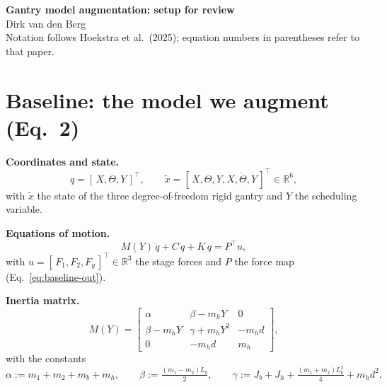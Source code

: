 \documentclass[11pt]{article}
\newcommand{\R}{\mathbb{R}}
\newcommand{\xb}{\tilde{x}}
\begin{document}
\begin{center}
  {\LARGE\bfseries Gantry model augmentation: setup for review}\\[0.4em]
  {\large Dirk van den Berg}\\[0.2em]
  {\small Notation follows Hoekstra et al.\ (2025); equation numbers in parentheses refer to that paper.}
\end{center}
\vspace{0.4em}

\section{Baseline: the model we augment \quad (Eq.~2)}

\noindent\textbf{Coordinates and state.}
\begin{equation}
  q = [\,X,\Theta,Y\,]^\top , \qquad
  \xb = [\,X,\Theta,Y,\dot X,\dot\Theta,\dot Y\,]^\top \in \R^6 ,
  \label{eq:baseline-state}
\end{equation}
with $\xb$ the state of the three degree-of-freedom rigid gantry and $Y$ the scheduling
variable.

\medskip\noindent\textbf{Equations of motion.}
\begin{equation}
  M(Y)\,\ddot q + C\,\dot q + K\,q = P^\top u ,
  \label{eq:baseline-eom}
\end{equation}
with $u = [\,F_1,F_2,F_y\,]^\top \in \R^3$ the stage forces and $P$ the force map
(Eq.~\ref{eq:baseline-out}).

\medskip\noindent\textbf{Inertia matrix.}
\begin{equation}
  M(Y) =
  \begin{bmatrix}
    \alpha            & \beta - m_h Y      & 0 \\[2mm]
    \beta - m_h Y     & \gamma + m_h Y^2   & -m_h d \\[2mm]
    0                 & -m_h d             & m_h
  \end{bmatrix},
  \label{eq:baseline-M}
\end{equation}
with the constants
\begin{equation}
  \alpha := m_1{+}m_2{+}m_b{+}m_h , \qquad
  \beta  := \tfrac{(m_1-m_2)L_b}{2} , \qquad
  \gamma := J_b{+}J_h{+}\tfrac{(m_1+m_2)L_b^2}{4}{+}m_h d^2 .
  \label{eq:baseline-consts}
\end{equation}
\end{document}
